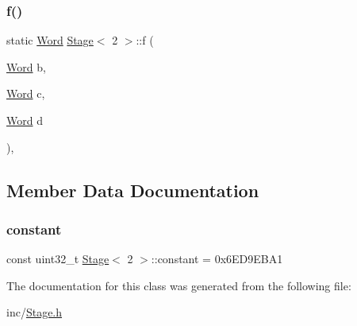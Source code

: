 \subsubsection{\texorpdfstring{f()}{f()}}
{\footnotesize\ttfamily static \mbox{\hyperlink{class_word}{Word}} \mbox{\hyperlink{class_stage}{Stage}}$<$ 2 $>$\+::f (\begin{DoxyParamCaption}\item[{\mbox{\hyperlink{class_word}{Word}}}]{b,  }\item[{\mbox{\hyperlink{class_word}{Word}}}]{c,  }\item[{\mbox{\hyperlink{class_word}{Word}}}]{d }\end{DoxyParamCaption})\hspace{0.3cm}{\ttfamily [inline]}, {\ttfamily [static]}}



\subsection{Member Data Documentation}
\mbox{\label{class_stage_3_012_01_4_acd36c94d48c66aea63f5fce216cbf3fa}} 
\subsubsection{\texorpdfstring{constant}{constant}}
{\footnotesize\ttfamily const uint32\+\_\+t \mbox{\hyperlink{class_stage}{Stage}}$<$ 2 $>$\+::constant = 0x6\+E\+D9\+E\+B\+A1\hspace{0.3cm}{\ttfamily [static]}}



The documentation for this class was generated from the following file\+:\begin{DoxyCompactItemize}
\item 
inc/\mbox{\hyperlink{_stage_8h}{Stage.\+h}}\end{DoxyCompactItemize}
